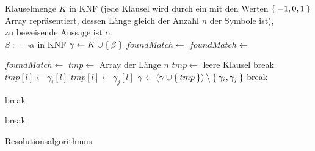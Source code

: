 \documentclass{article}
\begin{document}
\begin{preview}
    \begin{algorithm}[H]
        \begin{algorithmic}
        \Require Klauselmenge $K$ in KNF (jede Klausel wird durch ein mit den
        Werten $\Set{-1,0,1}$ Array
        repräsentiert, dessen Länge gleich der Anzahl $n$ der Symbole ist),\\
            zu beweisende Aussage ist $\alpha$,\\
            $\beta := \neg \alpha$ in KNF
			\State $\gamma \gets K \cup \Set{\beta}$
			\State $foundMatch \gets$ \True
		        \State $foundMatch \gets$ \False

		                        \State $foundMatch \gets$ \True
		                        \State $tmp \gets $ Array der Länge $n$
		                                \State $tmp \gets $ leere Klausel
		                                \State break
		                                \State $tmp[l] \gets \gamma_i[l]$
		                            \Else
		                                \State $tmp[l] \gets \gamma_j[l]$
		                            \EndIf
		                        \EndFor
		                        \State $\gamma \gets (\gamma \cup \Set{tmp}) \setminus
		                                \Set{\gamma_i, \gamma_j}$
		                        \State break
		                    \EndIf
		                \EndFor

		                    \State break
		                \EndIf
		            \EndFor

	                    \State break
	                \EndIf
		        \EndFor
			\EndWhile
		\EndProcedure
        \end{algorithmic}
    \caption{Resolutionsalgorithmus}
    \label{alg:resolutionsalgorithmus}
    \end{algorithm}
\end{preview}
\end{document}
